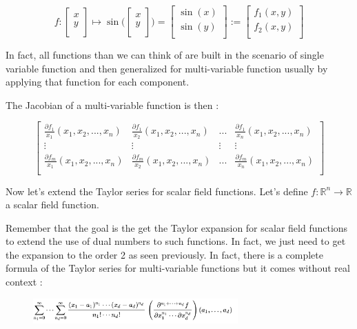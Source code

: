 \documentclass[12pt]{article}
\begin{document}
$$
f : 
\begin{bmatrix}
    x \\
    y \\
\end{bmatrix}
 \mapsto \sin \big(
    \begin{bmatrix}
    x \\
    y \\
    \end{bmatrix}
 \big) = \begin{bmatrix}
    \sin(x) \\
    \sin(y) \\
\end{bmatrix}
:= \begin{bmatrix}
    f_1(x, y) \\
    f_2(x, y) \\
\end{bmatrix}
$$

In fact, all functions than we can think of are built in the scenario of single variable function and then generalized for multi-variable function usually by applying that function for each component. 

The Jacobian of a multi-variable function is then :

$$
\begin{bmatrix}
    \frac{\partial{f_1}}{x_1}(x_1, x_2, ..., x_n) & \frac{\partial{f_1}}{x_2}(x_1, x_2, ..., x_n)  & ... & \frac{\partial{f_1}}{x_n}(x_1, x_2, ..., x_n) \\

    \vdots & \vdots & \vdots & \vdots \\

    \frac{\partial{f_m}}{x_1}(x_1, x_2, ..., x_n) & \frac{\partial{f_m}}{x_2}(x_1, x_2, ..., x_n)  & ...  &\frac{\partial{f_m}}{x_n}(x_1, x_2, ..., x_n) \\
\end{bmatrix}
$$

Now let's extend the Taylor series for scalar field functions. Let's define $f : \mathbb{R}^n \rightarrow \mathbb{R}$ a scalar field function.

Remember that the goal is the get the Taylor expansion for scalar field functions to extend the use of dual numbers to such functions. In fact, we just need to get the expansion to the order 2 as seen previously. In fact, there is a complete formula of the Taylor series for multi-variable functions but it comes without real context :


\begin{figure}[H]
\centering
\includegraphics[width=0.7\textwidth]{assets/images/Dx93rZHiBg.png}
\end{figure}
\end{document}
